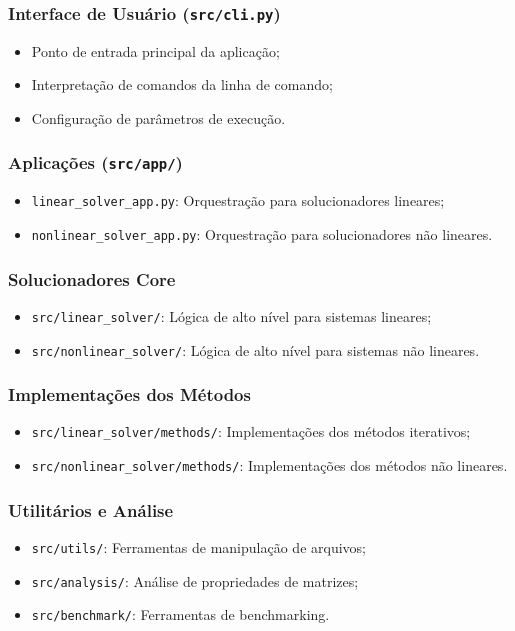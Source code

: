 \documentclass[12pt,a4paper]{article}
\begin{document}
\subsubsection*{Interface de Usuário (\texttt{src/cli.py})}
\begin{itemize}
  \item Ponto de entrada principal da aplicação;
  \item Interpretação de comandos da linha de comando;
  \item Configuração de parâmetros de execução.
\end{itemize}

\subsubsection*{Aplicações (\texttt{src/app/})}
\begin{itemize}
  \item \texttt{linear\_solver\_app.py}: Orquestração para solucionadores lineares;
  \item \texttt{nonlinear\_solver\_app.py}: Orquestração para solucionadores não lineares.
\end{itemize}

\subsubsection*{Solucionadores Core}
\begin{itemize}
  \item \texttt{src/linear\_solver/}: Lógica de alto nível para sistemas lineares;
  \item \texttt{src/nonlinear\_solver/}: Lógica de alto nível para sistemas não lineares.
\end{itemize}

\subsubsection*{Implementações dos Métodos}
\begin{itemize}
  \item \texttt{src/linear\_solver/methods/}: Implementações dos métodos iterativos;
  \item \texttt{src/nonlinear\_solver/methods/}: Implementações dos métodos não lineares.
\end{itemize}

\subsubsection*{Utilitários e Análise}
\begin{itemize}
  \item \texttt{src/utils/}: Ferramentas de manipulação de arquivos;
  \item \texttt{src/analysis/}: Análise de propriedades de matrizes;
  \item \texttt{src/benchmark/}: Ferramentas de benchmarking.
\end{itemize}
\end{document}
